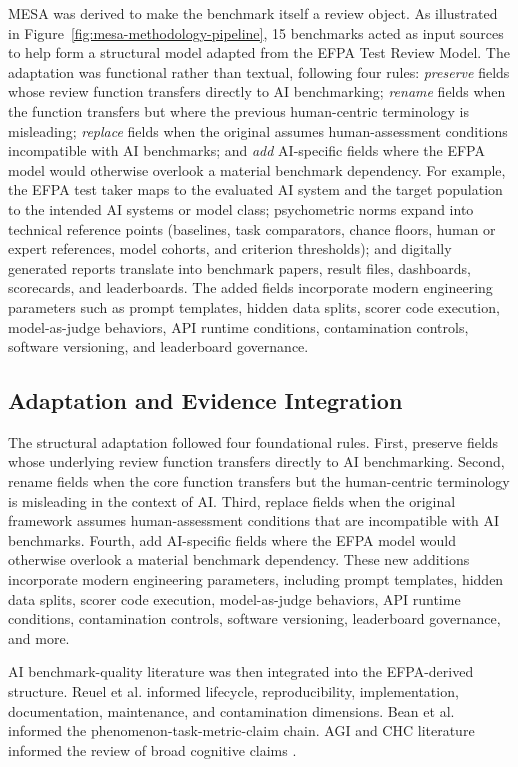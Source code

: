 \documentclass[conference]{IEEEtran}
\begin{document}
        MESA was derived to make the benchmark itself a review object. As illustrated in Figure~\ref{fig:mesa-methodology-pipeline}, 15 benchmarks acted as input sources to help form a structural model adapted from the EFPA Test Review Model. The adaptation was functional rather than textual, following four rules: \emph{preserve} fields whose review function transfers directly to AI benchmarking; \emph{rename} fields when the function transfers but where the previous human-centric terminology is misleading; \emph{replace} fields when the original assumes human-assessment conditions incompatible with AI benchmarks; and \emph{add} AI-specific fields where the EFPA model would otherwise overlook a material benchmark dependency. For example, the EFPA test taker maps to the evaluated AI system and the target population to the intended AI systems or model class; psychometric norms expand into technical reference points (baselines, task comparators, chance floors, human or expert references, model cohorts, and criterion thresholds); and digitally generated reports translate into benchmark papers, result files, dashboards, scorecards, and leaderboards. The added fields incorporate modern engineering parameters such as prompt templates, hidden data splits, scorer code execution, model-as-judge behaviors, API runtime conditions, contamination controls, software versioning, and leaderboard governance.
    
    \subsection{Adaptation and Evidence Integration}
    
        The structural adaptation followed four foundational rules. First, preserve fields whose underlying review function transfers directly to AI benchmarking. Second, rename fields when the core function transfers but the human-centric terminology is misleading in the context of AI. Third, replace fields when the original framework assumes human-assessment conditions that are incompatible with AI benchmarks. Fourth, add AI-specific fields where the EFPA model would otherwise overlook a material benchmark dependency. These new additions incorporate modern engineering parameters, including prompt templates, hidden data splits, scorer code execution, model-as-judge behaviors, API runtime conditions, contamination controls, software versioning, leaderboard governance, and more.
        
        AI benchmark-quality literature was then integrated into the EFPA-derived structure. Reuel et al. \cite{reuel_betterbench} informed lifecycle, reproducibility, implementation, documentation, maintenance, and contamination dimensions. Bean et al. \cite{bean_measuring_what_matters} informed the phenomenon-task-metric-claim chain. AGI and CHC literature informed the review of broad cognitive claims \cite{hendrycks_definition_agi}.
    
\end{document}
